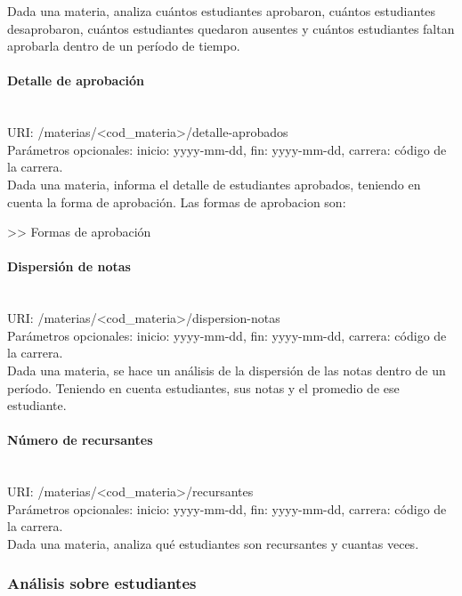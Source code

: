 Dada una materia, analiza cuántos estudiantes aprobaron, cuántos estudiantes desaprobaron, cuántos estudiantes quedaron ausentes y cuántos estudiantes faltan aprobarla dentro de un período de tiempo.

\paragraph{Detalle de aprobación}\mbox{}\\

URI: /materias/<cod\_materia>/detalle-aprobados \\

Parámetros opcionales: inicio: yyyy-mm-dd, fin: yyyy-mm-dd, carrera: código de la carrera. \\

Dada una materia, informa el detalle de estudiantes aprobados, teniendo en cuenta la forma de aprobación. Las formas de aprobacion son:

>> Formas de aprobación

\paragraph{Dispersión de notas}\mbox{}\\

URI: /materias/<cod\_materia>/dispersion-notas \\

Parámetros opcionales: inicio: yyyy-mm-dd, fin: yyyy-mm-dd, carrera: código de la carrera. \\

Dada una materia, se hace un análisis de la dispersión de las notas dentro de un período. Teniendo en cuenta estudiantes, sus notas y el promedio de ese estudiante.

\paragraph{Número de recursantes}\mbox{}\\

URI: /materias/<cod\_materia>/recursantes \\

Parámetros opcionales: inicio: yyyy-mm-dd, fin: yyyy-mm-dd, carrera: código de la carrera. \\

Dada una materia, analiza qué estudiantes son recursantes y cuantas veces.


\subsubsection{Análisis sobre estudiantes}

